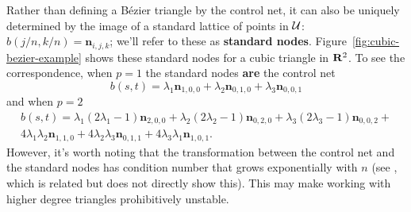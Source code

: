 \noindent Rather than defining a B\'{e}zier triangle by the control net, it can
also be uniquely determined by the image of a standard lattice of
points in \(\mathcal{U}\): \(b\left(j/n, k/n\right) = \bm{n}_{i, j, k}\);
we'll refer to these as \textbf{standard nodes}.
Figure~\ref{fig:cubic-bezier-example} shows these standard nodes for
a cubic triangle in \(\mathbf{R}^2\). To see the correspondence,
when \(p = 1\) the standard nodes \textbf{are} the control net
\begin{equation}
b(s, t) = \lambda_1 \bm{n}_{1, 0, 0} +
\lambda_2 \bm{n}_{0, 1, 0} + \lambda_3 \bm{n}_{0, 0, 1}
\end{equation}
and when \(p = 2\)
\begin{multline}
b(s, t) = \lambda_1\left(2 \lambda_1 - 1\right) \bm{n}_{2, 0, 0} +
\lambda_2\left(2 \lambda_2 - 1\right) \bm{n}_{0, 2, 0} +
\lambda_3\left(2 \lambda_3 - 1\right) \bm{n}_{0, 0, 2} + \\
4 \lambda_1 \lambda_2 \bm{n}_{1, 1, 0} +
4 \lambda_2 \lambda_3 \bm{n}_{0, 1, 1} +
4 \lambda_3 \lambda_1 \bm{n}_{1, 0, 1}.
\end{multline}
However, it's worth noting that the transformation between
the control net and the standard nodes has condition
number that grows exponentially with \(n\) (see \cite{Farouki1991}, which
is related but does not directly show this).
This may make working with
higher degree triangles prohibitively unstable.

